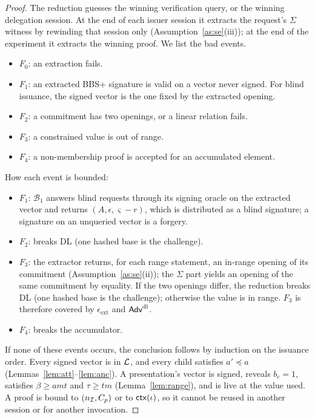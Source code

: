 \begin{proof}
The reduction guesses the winning verification query, or the winning delegation session. At the end of each issuer session it extracts the request's $\Sigma$ witness by rewinding that session only (Assumption~\ref{as:se}(iii)); at the end of the experiment it extracts the winning proof. We list the bad events.
\begin{itemize}[leftmargin=*]
\item $F_0$: an extraction fails.
\item $F_1$: an extracted BBS+ signature is valid on a vector never signed. For blind issuance, the signed vector is the one fixed by the extracted opening.
\item $F_2$: a commitment has two openings, or a linear relation fails.
\item $F_3$: a constrained value is out of range.
\item $F_4$: a non-membership proof is accepted for an accumulated element.
\end{itemize}
How each event is bounded:
\begin{itemize}[leftmargin=*]
\item $F_1$: $\mathcal{B}_1$ answers blind requests through its signing oracle on the extracted vector and returns $(A,\epsilon,\varsigma-r)$, which is distributed as a blind signature; a signature on an unqueried vector is a forgery.
\item $F_2$: breaks DL (one hashed base is the challenge).
\item $F_3$: the extractor returns, for each range statement, an in-range opening of its commitment (Assumption~\ref{as:se}(ii)); the $\Sigma$ part yields an opening of the same commitment by equality. If the two openings differ, the reduction breaks DL (one hashed base is the challenge); otherwise the value is in range. $F_3$ is therefore covered by $\epsilon_{\mathrm{ext}}$ and $\mathsf{Adv}^{\mathrm{dl}}$.
\item $F_4$: breaks the accumulator.
\end{itemize}
If none of these events occurs, the conclusion follows by induction on the issuance order. Every signed vector is in $\mathcal{L}$, and every child satisfies $a'\preceq a$ (Lemmas~\ref{lem:att}--\ref{lem:anc}). A presentation's vector is signed, reveals $b_c=1$, satisfies $\beta\ge\mathit{amt}$ and $\tau\ge\mathit{tm}$ (Lemma~\ref{lem:range}), and is live at the value used. A proof is bound to $(n_{\mathcal{I}},C_p)$ or to $\mathsf{ctx}(\iota)$, so it cannot be reused in another session or for another invocation.
\end{proof}


